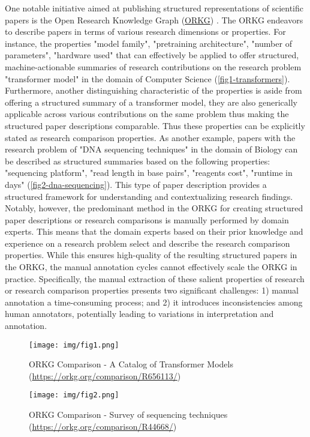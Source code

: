 One notable initiative aimed at publishing structured representations of scientific papers is the Open Research Knowledge Graph (\href{https://orkg.org/}{ORKG}) \cite{auer2020improving}. The ORKG endeavors to describe papers in terms of various research dimensions or properties. For instance, the properties "model family", "pretraining architecture", "number of parameters", "hardware used" that can effectively be applied to offer structured, machine-actionable summaries of research contributions on the research problem "transformer model" in the domain of Computer Science (\autoref{fig1-transformers}). Furthermore, another distinguishing characteristic of the properties is aside from offering a structured summary of a transformer model, they are also generically applicable across various contributions on the same problem thus making the structured paper descriptions comparable. Thus these properties can be explicitly stated as research comparison properties. As another example, papers with the research problem of "DNA sequencing techniques" in the domain of Biology can be described as structured summaries based on the following properties: "sequencing platform", "read length in base pairs", "reagents cost", "runtime in days" (\autoref{fig2-dna-sequencing}). This type of paper description provides a structured framework for understanding and contextualizing research findings. Notably, however, the predominant method in the ORKG for creating structured paper descriptions or research comparisons is manually performed by domain experts. This means that the domain experts based on their prior knowledge and experience on a research problem select and describe the research comparison properties. While this ensures high-quality of the resulting structured papers in the ORKG, the manual annotation cycles cannot effectively scale the ORKG in practice. Specifically, the manual extraction of these salient properties of research or research comparison properties presents two significant challenges: 1) manual annotation a time-consuming process; and 2) it introduces inconsistencies among human annotators, potentially leading to variations in interpretation and annotation.

\begin{figure}[!htb]
\texttt{[image: img/fig1.png]}
\caption{ORKG Comparison - A Catalog of Transformer Models (\url{https://orkg.org/comparison/R656113/})\label{fig1-transformers}}
\end{figure} 

\begin{figure}[!htb]
\texttt{[image: img/fig2.png]}
\caption{ORKG Comparison - Survey of sequencing techniques (\url{https://orkg.org/comparison/R44668/})\label{fig2-dna-sequencing}}
\end{figure} 

